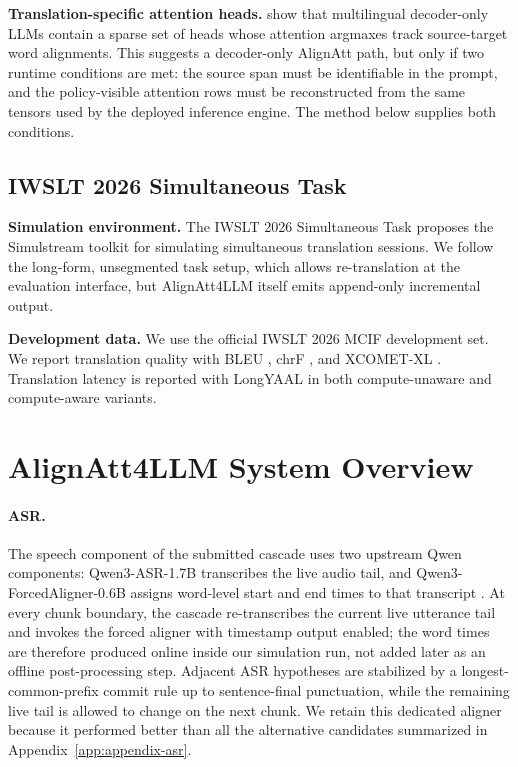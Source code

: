 \documentclass[11pt]{article}
\def\Aref#1{Appendix~\ref{#1}}
\def\AAName{AlignAtt4LLM}
\begin{document}
\textbf{Translation-specific attention heads.} \citet{tokenheads26} show that
multilingual decoder-only LLMs contain a sparse set of heads whose attention
argmaxes track source-target word alignments. This suggests a decoder-only
AlignAtt path, but only if two runtime conditions are met: the source span must
be identifiable in the prompt, and the policy-visible attention rows
must be reconstructed from the same tensors used by the deployed inference
engine. The method below supplies both conditions.

\subsection{IWSLT 2026 Simultaneous Task}

\textbf{Simulation environment.} The IWSLT 2026 Simultaneous Task proposes the
Simulstream toolkit \citep{simulstream25} for simulating simultaneous
translation sessions. We follow the long-form, unsegmented task setup, which
allows re-translation at the evaluation interface, but \AAName{} itself emits
append-only incremental output.

\textbf{Development data.} We use the official IWSLT 2026 MCIF development
set.
We report translation quality with BLEU
\citep{papineni-etal-2002-bleu}, chrF \citep{popovic-2015-chrf}, and
XCOMET-XL \citep{xcometxl24}. Translation latency is reported with LongYAAL
\citep{longyaal25} in both compute-unaware and compute-aware variants.


\section{\AAName{} System Overview}
\label{sec:system}

\paragraph{ASR.}
The speech component of the submitted cascade uses two upstream Qwen components:
Qwen3-ASR-1.7B transcribes the live audio tail, and Qwen3-ForcedAligner-0.6B
assigns word-level start and end times to that transcript \citep{qwen3asr26}.
At every chunk boundary, the cascade re-transcribes the current live utterance
tail and invokes the forced aligner with timestamp output enabled; the word
times are therefore produced online inside our simulation run, not added later
as an offline post-processing step. Adjacent ASR hypotheses are stabilized by a
longest-common-prefix commit rule up to sentence-final punctuation, while the
remaining live tail is allowed to change on the next chunk.
We retain this dedicated aligner because it performed better than all the alternative candidates summarized in \Aref{app:appendix-asr}.
\end{document}

